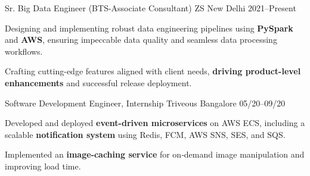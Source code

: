 

\begin{cventries}

  \cventry
    {Sr. Big Data Engineer (BTS-Associate Consultant)} %
    {ZS} %
    {New Delhi} %
    {2021--Present} %
    {
      \begin{cvitems} %
        \item {Designing and implementing robust data engineering pipelines using \textbf{PySpark} and \textbf{AWS}, ensuring impeccable data quality and seamless data processing workflows.}
        \item {Crafting cutting-edge features aligned with client needs, \textbf{driving product-level enhancements} and successful release deployment.}
      \end{cvitems}
    }
    {}
  \cventry
    {Software Development Engineer, Internship} %
    {Triveous} %
    {Bangalore} %
    {05/20--09/20} %
    {
      \begin{cvitems} %
        \item {Developed and deployed \textbf{event-driven microservices} on AWS ECS, including a scalable \textbf{notification system} using Redis, FCM, AWS SNS, SES, and SQS.}
        \item {Implemented an \textbf{image‑caching service} for on‑demand image manipulation and improving load time.}

\end{cvitems}}
\end{cventries}
